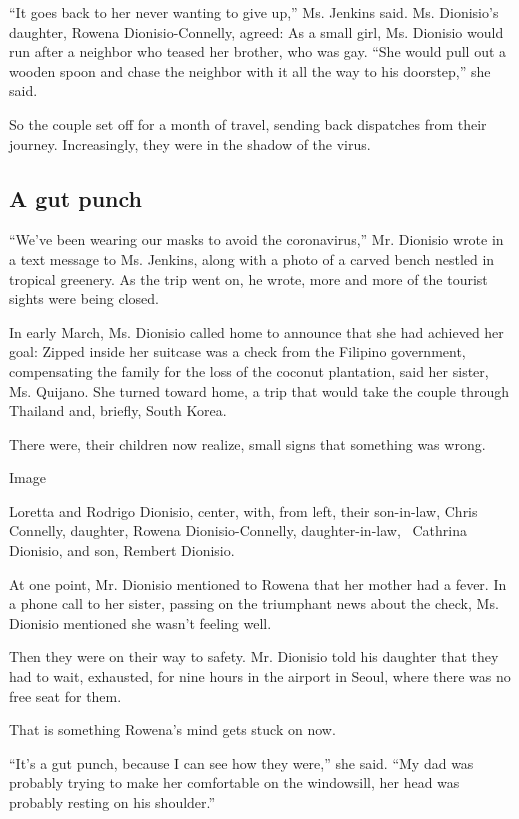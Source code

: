 ``It goes back to her never wanting to give up,'' Ms. Jenkins said. Ms.
Dionisio's daughter, Rowena Dionisio-Connelly, agreed: As a small girl,
Ms. Dionisio would run after a neighbor who teased her brother, who was
gay. ``She would pull out a wooden spoon and chase the neighbor with it
all the way to his doorstep,'' she said.

So the couple set off for a month of travel, sending back dispatches
from their journey. Increasingly, they were in the shadow of the virus.

\hypertarget{a-gut-punch}{%
\subsection{A gut punch}\label{a-gut-punch}}

``We've been wearing our masks to avoid the coronavirus,'' Mr. Dionisio
wrote in a text message to Ms. Jenkins, along with a photo of a carved
bench nestled in tropical greenery. As the trip went on, he wrote, more
and more of the tourist sights were being closed.

In early March, Ms. Dionisio called home to announce that she had
achieved her goal: Zipped inside her suitcase was a check from the
Filipino government, compensating the family for the loss of the coconut
plantation, said her sister, Ms. Quijano. She turned toward home, a trip
that would take the couple through Thailand and, briefly, South Korea.

There were, their children now realize, small signs that something was
wrong.

Image

Loretta and Rodrigo Dionisio, center, with, from left, their son-in-law,
Chris Connelly, daughter, Rowena Dionisio-Connelly, daughter-in-law,~
Cathrina Dionisio, and son, Rembert Dionisio.

At one point, Mr. Dionisio mentioned to Rowena that her mother had a
fever. In a phone call to her sister, passing on the triumphant news
about the check, Ms. Dionisio mentioned she wasn't feeling well.

Then they were on their way to safety. Mr. Dionisio told his daughter
that they had to wait, exhausted, for nine hours in the airport in
Seoul, where there was no free seat for them.

That is something Rowena's mind gets stuck on now.

``It's a gut punch, because I can see how they were,'' she said. ``My
dad was probably trying to make her comfortable on the windowsill, her
head was probably resting on his shoulder.''

